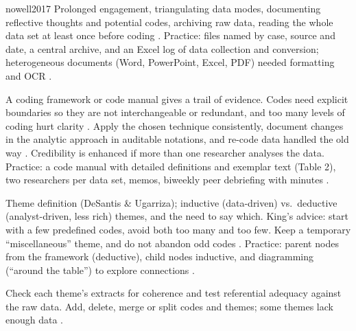 \begin{papercard}{nowell2017}
 Prolonged engagement, triangulating data modes, documenting reflective thoughts and potential codes, archiving raw data, reading the whole data set at least once before coding . Practice: files named by case, source and date, a central archive, and an Excel log of data collection and conversion; heterogeneous documents (Word, PowerPoint, Excel, PDF) needed formatting and OCR .

 A coding framework or code manual gives a trail of evidence. Codes need explicit boundaries so they are not interchangeable or redundant, and too many levels of coding hurt clarity . Apply the chosen technique consistently, document changes in the analytic approach in auditable notations, and re-code data handled the old way . Credibility is enhanced if more than one researcher analyses the data. Practice: a code manual with detailed definitions and exemplar text (Table 2), two researchers per data set, memos, biweekly peer debriefing with minutes .

 Theme definition (DeSantis \& Ugarriza); inductive (data-driven) vs.\ deductive (analyst-driven, less rich) themes, and the need to say which. King's advice: start with a few predefined codes, avoid both too many and too few. Keep a temporary ``miscellaneous'' theme, and do not abandon odd codes . Practice: parent nodes from the framework (deductive), child nodes inductive, and diagramming (``around the table'') to explore connections .

 Check each theme's extracts for coherence and test referential adequacy against the raw data. Add, delete, merge or split codes and themes; some themes lack enough data .


\end{papercard}
